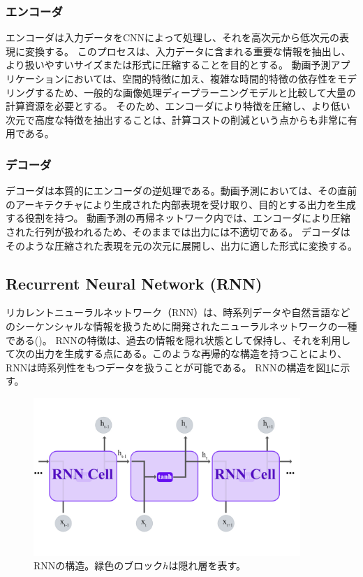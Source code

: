       \subsubsection{エンコーダ}
        エンコーダは入力データをCNNによって処理し、それを高次元から低次元の表現に変換する。
        このプロセスは、入力データに含まれる重要な情報を抽出し、より扱いやすいサイズまたは形式に圧縮することを目的とする。
        動画予測アプリケーションにおいては、空間的特徴に加え、複雑な時間的特徴の依存性をモデリングするため、一般的な画像処理ディープラーニングモデルと比較して大量の計算資源を必要とする。
        そのため、エンコーダにより特徴を圧縮し、より低い次元で高度な特徴を抽出することは、計算コストの削減という点からも非常に有用である。
        
      \subsubsection{デコーダ}
        デコーダは本質的にエンコーダの逆処理である。動画予測においては、その直前のアーキテクチャにより生成された内部表現を受け取り、目的とする出力を生成する役割を持つ。
        動画予測の再帰ネットワーク内では、エンコーダにより圧縮された行列が扱われるため、そのままでは出力には不適切である。
        デコーダはそのような圧縮された表現を元の次元に展開し、出力に適した形式に変換する。

    \subsection{Recurrent Neural Network (RNN)}
    リカレントニューラルネットワーク（RNN）は、時系列データや自然言語などのシーケンシャルな情報を扱うために開発されたニューラルネットワークの一種である()。
    RNNの特徴は、過去の情報を隠れ状態として保持し、それを利用して次の出力を生成する点にある。このような再帰的な構造を持つことにより、RNNは時系列性をもつデータを扱うことが可能である。
    RNNの構造を図\ref{fig:rnn}に示す。
    \begin{figure}[htbp]
      \centering
      \includegraphics[width=0.9\textwidth]{figures/videoprediction/rnn.jpg}
      \caption{RNNの構造。緑色のブロック\( h \)は隠れ層を表す。}
      \label{fig:rnn}
    \end{figure}
    
